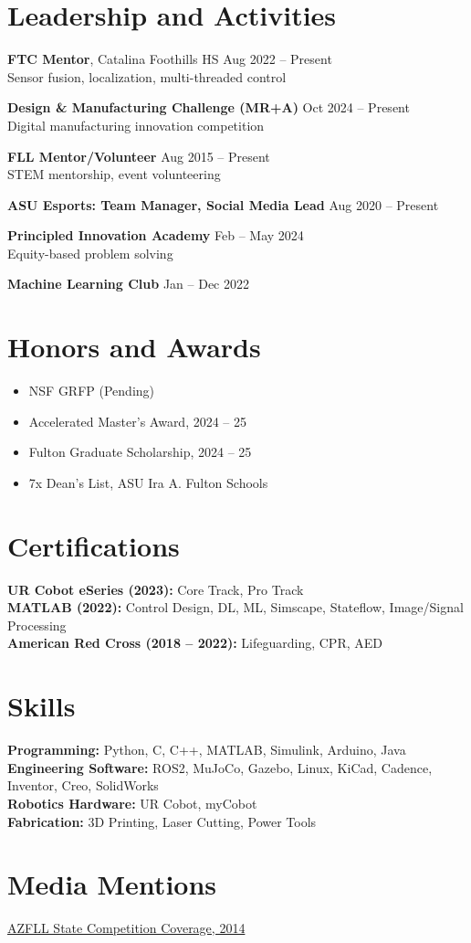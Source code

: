 \documentclass[11pt]{article}
\begin{document}
\section*{Leadership and Activities}
\textbf{FTC Mentor}, Catalina Foothills HS \hfill Aug 2022 -- Present\\
Sensor fusion, localization, multi-threaded control

\textbf{Design \& Manufacturing Challenge (MR+A)} \hfill Oct 2024 -- Present\\
Digital manufacturing innovation competition

\textbf{FLL Mentor/Volunteer} \hfill Aug 2015 -- Present\\
STEM mentorship, event volunteering

\textbf{ASU Esports: Team Manager, Social Media Lead} \hfill Aug 2020 -- Present

\textbf{Principled Innovation Academy} \hfill Feb -- May 2024\\
Equity-based problem solving

\textbf{Machine Learning Club} \hfill Jan -- Dec 2022

\section*{Honors and Awards}
\begin{itemize}
  \item NSF GRFP (Pending)
  \item Accelerated Master's Award, 2024 -- 25
  \item Fulton Graduate Scholarship, 2024 -- 25
  \item 7x Dean's List, ASU Ira A. Fulton Schools
\end{itemize}

\section*{Certifications}
\textbf{UR Cobot eSeries (2023):} Core Track, Pro Track\\
\textbf{MATLAB (2022):} Control Design, DL, ML, Simscape, Stateflow, Image/Signal Processing\\
\textbf{American Red Cross (2018 -- 2022):} Lifeguarding, CPR, AED

\section*{Skills}
\textbf{Programming:} Python, C, C++, MATLAB, Simulink, Arduino, Java\\
\textbf{Engineering Software:} ROS2, MuJoCo, Gazebo, Linux, KiCad, Cadence, Inventor, Creo, SolidWorks\\
\textbf{Robotics Hardware:} UR Cobot, myCobot\\
\textbf{Fabrication:} 3D Printing, Laser Cutting, Power Tools

\section*{Media Mentions}
\href{https://theeagleangle.blogspot.com/2014/12/foothills-lego-robotics-team-wins-azfll.html}{AZFLL State Competition Coverage, 2014}
\end{document}

